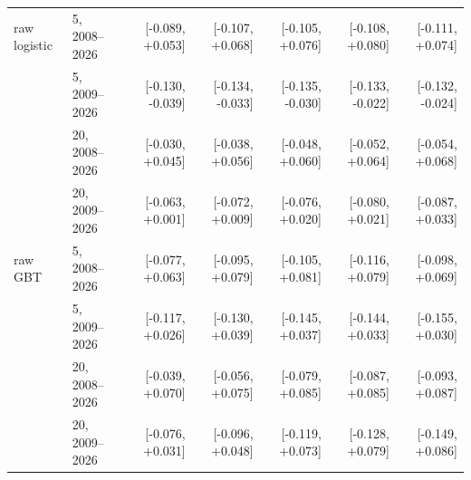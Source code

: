 \begin{tabular}{llrrrrr}
raw logistic & 5, 2008--2026 & [-0.089, +0.053] & [-0.107, +0.068] & [-0.105, +0.076] & [-0.108, +0.080] & [-0.111, +0.074]\\
 & 5, 2009--2026 & [-0.130, -0.039] & [-0.134, -0.033] & [-0.135, -0.030] & [-0.133, -0.022] & [-0.132, -0.024]\\
 & 20, 2008--2026 & [-0.030, +0.045] & [-0.038, +0.056] & [-0.048, +0.060] & [-0.052, +0.064] & [-0.054, +0.068]\\
 & 20, 2009--2026 & [-0.063, +0.001] & [-0.072, +0.009] & [-0.076, +0.020] & [-0.080, +0.021] & [-0.087, +0.033]\\
raw GBT & 5, 2008--2026 & [-0.077, +0.063] & [-0.095, +0.079] & [-0.105, +0.081] & [-0.116, +0.079] & [-0.098, +0.069]\\
 & 5, 2009--2026 & [-0.117, +0.026] & [-0.130, +0.039] & [-0.145, +0.037] & [-0.144, +0.033] & [-0.155, +0.030]\\
 & 20, 2008--2026 & [-0.039, +0.070] & [-0.056, +0.075] & [-0.079, +0.085] & [-0.087, +0.085] & [-0.093, +0.087]\\
 & 20, 2009--2026 & [-0.076, +0.031] & [-0.096, +0.048] & [-0.119, +0.073] & [-0.128, +0.079] & [-0.149, +0.086]\\
\bottomrule\end{tabular}
